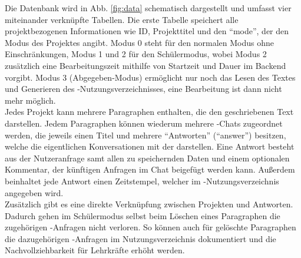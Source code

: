 \documentclass[../main.tex]{subfiles}
\begin{document}
Die Datenbank wird in Abb. \ref{fig:data} schematisch dargestellt und umfasst vier miteinander verknüpfte Tabellen. Die erste Tabelle speichert alle projektbezogenen Informationen wie ID, 
Projekttitel und den "`mode"', der den Modus des Projektes angibt. Modus 0 steht für den normalen Modus ohne Einschränkungen, Modus 1 und 2 für den Schülermodus, wobei Modus 2 zusätzlich 
eine Bearbeitungszeit mithilfe von Startzeit und Dauer im Backend vorgibt. Modus 3 (Abgegeben-Modus) ermöglicht nur noch das Lesen des Textes und Generieren des -Nutzungsverzeichnisses, 
eine Bearbeitung ist dann nicht mehr möglich.\\ Jedes Projekt kann mehrere Paragraphen enthalten, die den geschriebenen Text darstellen. Jedem Paragraphen können wiederum mehrere 
-Chats zugeordnet werden, die jeweils einen Titel und mehrere "`Antworten"' ("`answer"') besitzen, welche die eigentlichen Konversationen mit der  darstellen. Eine Antwort besteht aus 
der Nutzeranfrage samt allen zu speichernden Daten und einem optionalen Kommentar, der künftigen Anfragen im Chat beigefügt werden kann. Außerdem beinhaltet jede Antwort einen 
Zeitstempel, welcher im -Nutzungsverzeichnis angegeben wird.\\ Zusätzlich gibt es eine direkte Verknüpfung zwischen Projekten und Antworten. Dadurch gehen im 
Schülermodus selbst beim Löschen eines Paragraphen die zugehörigen -Anfragen nicht verloren. So können auch für gelöschte Paragraphen die dazugehörigen -Anfragen 
im Nutzungsverzeichnis dokumentiert und die Nachvollziehbarkeit für Lehrkräfte erhöht werden.
\end{document}
